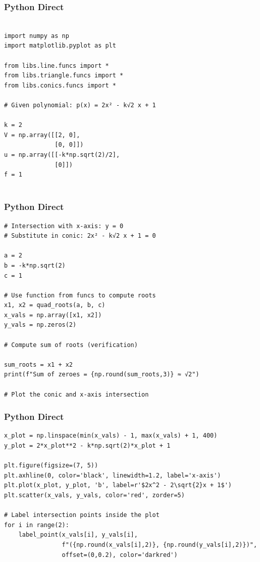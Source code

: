 \documentclass{beamer}
\begin{document}
\begin{frame}[fragile]
    \frametitle{Python Direct}
    \begin{lstlisting}
        
import numpy as np
import matplotlib.pyplot as plt

from libs.line.funcs import *
from libs.triangle.funcs import *
from libs.conics.funcs import *

# Given polynomial: p(x) = 2x² - k√2 x + 1

k = 2
V = np.array([[2, 0],
              [0, 0]])
u = np.array([[-k*np.sqrt(2)/2],
              [0]])
f = 1


 \end{lstlisting}
\end{frame}

\begin{frame}[fragile]
    \frametitle{Python Direct}
    \begin{lstlisting}
# Intersection with x-axis: y = 0
# Substitute in conic: 2x² - k√2 x + 1 = 0

a = 2
b = -k*np.sqrt(2)
c = 1

# Use function from funcs to compute roots
x1, x2 = quad_roots(a, b, c)
x_vals = np.array([x1, x2])
y_vals = np.zeros(2)

# Compute sum of roots (verification)

sum_roots = x1 + x2
print(f"Sum of zeroes = {np.round(sum_roots,3)} ≈ √2")

# Plot the conic and x-axis intersection
 \end{lstlisting}
\end{frame}

\begin{frame}[fragile]
    \frametitle{Python Direct}
    \begin{lstlisting}
x_plot = np.linspace(min(x_vals) - 1, max(x_vals) + 1, 400)
y_plot = 2*x_plot**2 - k*np.sqrt(2)*x_plot + 1

plt.figure(figsize=(7, 5))
plt.axhline(0, color='black', linewidth=1.2, label='x-axis')
plt.plot(x_plot, y_plot, 'b', label=r'$2x^2 - 2\sqrt{2}x + 1$')
plt.scatter(x_vals, y_vals, color='red', zorder=5)

# Label intersection points inside the plot
for i in range(2):
    label_point(x_vals[i], y_vals[i],
                f"({np.round(x_vals[i],2)}, {np.round(y_vals[i],2)})",
                offset=(0,0.2), color='darkred')
 \end{lstlisting}
\end{frame}
\end{document}
